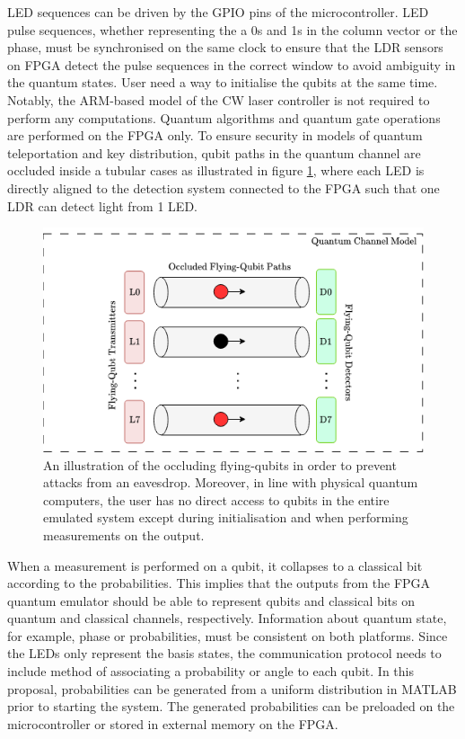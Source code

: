 LED sequences can be driven by the GPIO pins of the microcontroller. LED pulse sequences, whether representing the a 0s and 1s in the column vector or the phase, must be synchronised on the same clock to ensure that the LDR sensors on FPGA detect the pulse sequences in the correct window to avoid ambiguity in the quantum states. User need a way to initialise the qubits at the same time. Notably, the ARM-based model of the CW laser controller is not required to perform any computations. Quantum algorithms and quantum gate operations are performed on the FPGA only. To ensure security in models of quantum teleportation and key distribution, qubit paths in the quantum channel are occluded inside a tubular cases as illustrated in figure \ref{fig:led-to-ldr}, where each LED is directly aligned to the detection system connected to the FPGA such that one LDR can detect light from 1 LED.
\begin{figure}[!ht]
	\centering
	\includegraphics[width=1.0\linewidth]{body/ch4/figs/led-to-ldr}
	\caption[Illustration of the Security Measurements Implemented in the Quantum Communication Channel.]{An illustration of the occluding flying-qubits in order to prevent attacks from an eavesdrop. Moreover, in line with physical quantum computers, the user has no direct access to qubits in the entire emulated system except during initialisation and when performing measurements on the output.}
	\label{fig:led-to-ldr}
\end{figure}

When a measurement is performed on a qubit, it collapses to a classical bit according to the probabilities. This implies that the outputs from the FPGA quantum emulator should be able to represent qubits and classical bits on quantum and classical channels, respectively. Information about quantum state, for example, phase or probabilities, must be consistent on both platforms. Since the LEDs only represent the basis states, the communication protocol needs to include method of associating a probability or angle to each qubit. In this proposal, probabilities can be generated from a uniform distribution in MATLAB prior to starting the system. The generated probabilities can be preloaded on the microcontroller or stored in external memory on the FPGA.

